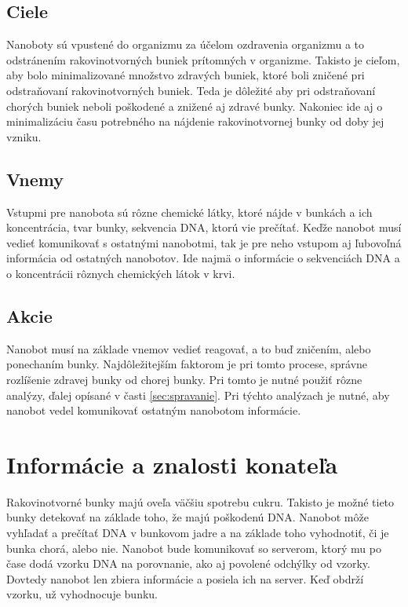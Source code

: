 \documentclass[10pt,twoside,slovak,a4paper]{article}
\begin{document}
\subsection{Ciele}
Nanoboty sú vpustené do organizmu za účelom ozdravenia organizmu a to odstránením rakovinotvorných buniek prítomných v organizme. Takisto je cieľom, aby bolo minimalizované množstvo zdravých buniek, ktoré boli zničené pri odstraňovaní rakovinotvorných buniek. Teda je dôležité aby pri odstraňovaní chorých buniek neboli poškodené a znižené aj zdravé bunky. Nakoniec ide aj o minimalizáciu času potrebného na nájdenie rakovinotvornej bunky od doby jej vzniku.

\subsection{Vnemy}
Vstupmi pre nanobota sú rôzne chemické látky, ktoré nájde v bunkách a ich koncentrácia, tvar bunky, sekvencia DNA, ktorú vie prečítať. Keďže nanobot musí vedieť komunikovať s ostatnými nanobotmi, tak je pre neho vstupom aj ľubovoľná informácia od ostatných nanobotov. Ide najmä o informácie o sekvenciách DNA a o koncentrácii rôznych chemických látok v krvi.

\subsection{Akcie}
Nanobot musí na základe vnemov vedieť reagovať, a to buď zničením, alebo ponechaním bunky. Najdôležitejším faktorom je pri tomto procese, správne rozlíšenie zdravej bunky od chorej bunky. Pri tomto je nutné použiť rôzne analýzy, ďalej opísané v časti \ref{sec:spravanie}. Pri týchto analýzach je nutné, aby nanobot vedel komunikovať ostatným nanobotom informácie.


\section{Informácie a znalosti konateľa}
\label{sec:znalosti}
Rakovinotvorné bunky majú oveľa väčšiu spotrebu cukru. Takisto je možné tieto bunky detekovať na základe toho, že majú poškodenú DNA. Nanobot môže vyhľadať a prečítať DNA v bunkovom jadre a na základe toho vyhodnotiť, či je bunka chorá, alebo nie.
\cite{Wikipedia-nador,cancer-cell-metabolism}
Nanobot bude komunikovať so serverom, ktorý mu po čase dodá vzorku DNA na porovnanie, ako aj povolené odchýlky od vzorky. Dovtedy nanobot len zbiera informácie a posiela ich na server. Keď obdrží vzorku, už vyhodnocuje bunku.
\end{document}
